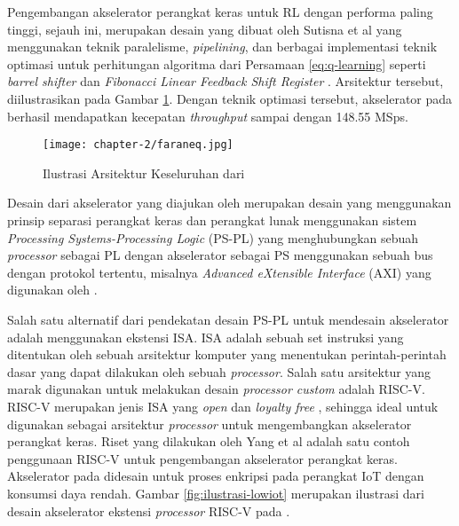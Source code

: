 Pengembangan akselerator perangkat keras untuk \ac{RL} dengan performa paling tinggi, sejauh ini, merupakan desain yang dibuat oleh Sutisna et al \parencite{sutisna2023faraneq} yang menggunakan teknik paralelisme, \textit{pipelining}, dan berbagai implementasi teknik optimasi untuk perhitungan algoritma dari Persamaan \ref{eq:q-learning} seperti \textit{barrel shifter}  dan \textit{Fibonacci Linear Feedback Shift Register} \parencite{panda2012FPGA}. Arsitektur tersebut, diilustrasikan pada Gambar \ref{fig:ilustrasi-faraneq}. Dengan teknik optimasi tersebut, akselerator pada \parencite{sutisna2023faraneq} berhasil mendapatkan kecepatan \textit{throughput} sampai dengan 148.55 MSps.


\begin{figure}[h]
	\centering
	\texttt{[image: chapter-2/faraneq.jpg]}
	\caption{Ilustrasi Arsitektur Keseluruhan dari \parencite{sutisna2023faraneq}}
	\label{fig:ilustrasi-faraneq}
\end{figure}

Desain dari akselerator yang diajukan oleh \parencite{sutisna2023faraneq, dasilva2019parallel, panda2012FPGA} merupakan desain yang menggunakan prinsip separasi perangkat keras dan perangkat lunak menggunakan sistem \textit{Processing Systems-Processing Logic} (PS-PL) yang menghubungkan sebuah \textit{processor} sebagai PL dengan akselerator sebagai PS menggunakan sebuah bus dengan protokol tertentu, misalnya \textit{Advanced eXtensible Interface} (AXI) yang digunakan oleh \parencite{sutisna2023faraneq}.

Salah satu alternatif dari pendekatan desain PS-PL untuk mendesain akselerator adalah menggunakan ekstensi \ac{ISA}. \ac{ISA} adalah sebuah set instruksi yang ditentukan oleh sebuah arsitektur komputer yang menentukan perintah-perintah dasar yang dapat dilakukan oleh sebuah \textit{processor}. Salah satu arsitektur yang marak digunakan untuk melakukan desain \textit{processor custom} adalah RISC-V. RISC-V merupakan jenis \ac{ISA} yang \textit{open} dan \textit{loyalty free} \parencite{miyazaki2020rvcorep}, sehingga ideal untuk digunakan sebagai arsitektur \textit{processor} untuk mengembangkan akselerator perangkat keras. Riset yang dilakukan oleh Yang et al \parencite{yang2023design} adalah satu contoh penggunaan RISC-V untuk pengembangan akselerator perangkat keras. Akselerator pada \parencite{yang2023design} didesain untuk proses enkripsi pada perangkat \ac{IoT} dengan konsumsi daya rendah. Gambar \ref{fig:ilustrasi-lowiot} merupakan ilustrasi dari desain akselerator ekstensi \textit{processor} RISC-V pada \parencite{yang2023design}.

